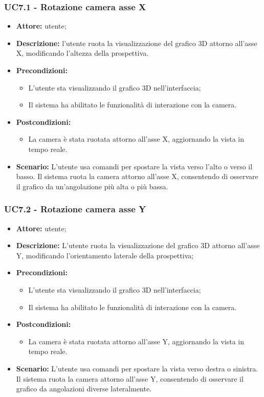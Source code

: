 \subsubsection{UC7.1 - Rotazione camera asse X}
\begin{itemize}
    \item \textbf{Attore:} utente;
    \item \textbf{Descrizione:} l'utente ruota la visualizzazione del grafico 3D attorno all'asse X, modificando l'altezza della prospettiva.
    \item \textbf{Precondizioni:} 
    \begin{itemize}
        \item L'utente sta visualizzando il grafico 3D nell'interfaccia;
        \item Il sistema ha abilitato le funzionalità di interazione con la camera.
    \end{itemize}
    \item \textbf{Postcondizioni:} 
    \begin{itemize}
        \item La camera è stata ruotata attorno all'asse X, aggiornando la vista in tempo reale.
    \end{itemize}
    \item \textbf{Scenario:}  
    L'utente usa comandi per spostare la vista verso l'alto o verso il basso. Il sistema ruota la camera attorno all'asse X, consentendo di osservare il grafico da un'angolazione più alta o più bassa.
\end{itemize}
\subsubsection{UC7.2 - Rotazione camera asse Y}
\begin{itemize}
    \item \textbf{Attore:} utente;
    \item \textbf{Descrizione:} L'utente ruota la visualizzazione del grafico 3D attorno all'asse Y, modificando l'orientamento laterale della prospettiva;
    \item \textbf{Precondizioni:} 
    \begin{itemize}
        \item L'utente sta visualizzando il grafico 3D nell'interfaccia;
        \item Il sistema ha abilitato le funzionalità di interazione con la camera.
    \end{itemize}
    \item \textbf{Postcondizioni:} 
    \begin{itemize}
        \item La camera è stata ruotata attorno all'asse Y, aggiornando la vista in tempo reale.
    \end{itemize}
    \item \textbf{Scenario:}  
    L'utente usa comandi per spostare la vista verso destra o sinistra. Il sistema ruota la camera attorno all'asse Y, consentendo di osservare il grafico da angolazioni diverse lateralmente.
\end{itemize}


